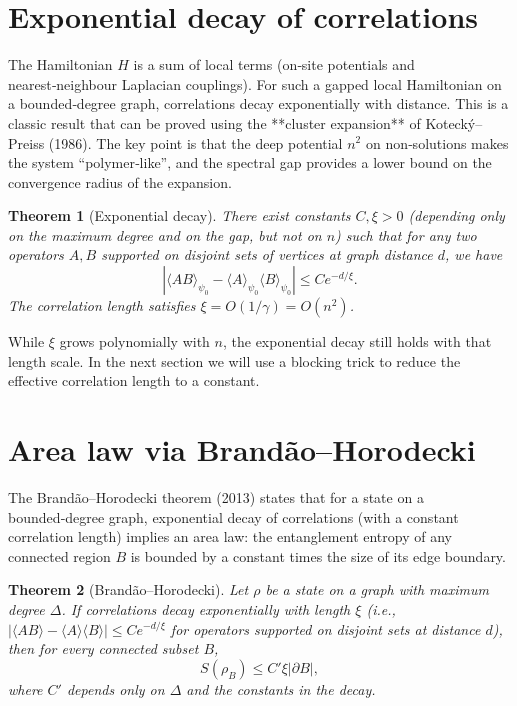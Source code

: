 \documentclass[11pt,a4paper]{article}
\newtheorem{theorem}{Theorem}[section]
\begin{document}
\section{Exponential decay of correlations}

The Hamiltonian \(H\) is a sum of local terms (on‑site potentials and nearest‑neighbour Laplacian couplings). For such a gapped local Hamiltonian on a bounded‑degree graph, correlations decay exponentially with distance. This is a classic result that can be proved using the **cluster expansion** of Kotecký–Preiss (1986). The key point is that the deep potential \(n^2\) on non‑solutions makes the system “polymer‑like”, and the spectral gap provides a lower bound on the convergence radius of the expansion.

\begin{theorem}[Exponential decay]\label{thm:exp}
There exist constants \(C,\xi>0\) (depending only on the maximum degree and on the gap, but not on \(n\)) such that for any two operators \(A,B\) supported on disjoint sets of vertices at graph distance \(d\), we have
\[
|\langle AB\rangle_{\psi_0} - \langle A\rangle_{\psi_0}\langle B\rangle_{\psi_0}| \le C e^{-d/\xi}.
\]
The correlation length satisfies \(\xi = O(1/\gamma) = O(n^2)\).
\end{theorem}

While \(\xi\) grows polynomially with \(n\), the exponential decay still holds with that length scale. In the next section we will use a blocking trick to reduce the effective correlation length to a constant.

\section{Area law via Brandão–Horodecki}

The Brandão–Horodecki theorem (2013) states that for a state on a bounded‑degree graph, exponential decay of correlations (with a constant correlation length) implies an area law: the entanglement entropy of any connected region \(B\) is bounded by a constant times the size of its edge boundary.

\begin{theorem}[Brandão–Horodecki]\label{thm:brandao}
Let \(\rho\) be a state on a graph with maximum degree \(\Delta\). If correlations decay exponentially with length \(\xi\) (i.e., \(|\langle AB\rangle - \langle A\rangle\langle B\rangle| \le C e^{-d/\xi}\) for operators supported on disjoint sets at distance \(d\)), then for every connected subset \(B\),
\[
S(\rho_B) \le C' \xi |\partial B|,
\]
where \(C'\) depends only on \(\Delta\) and the constants in the decay.
\end{theorem}
\end{document}
